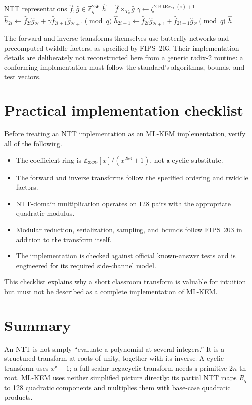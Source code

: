 \begin{algorithm}[H]
\caption{ML-KEM NTT-domain multiplication (conceptual form)}
\label{alg:mlkem-base-multiply}
\begin{algorithmic}[1]
\Require NTT representations $\hat f,\hat g\in\mathbb{Z}_q^{256}$
\Ensure $\hat h=\hat f\times_{T_q}\hat g$
  \State $\gamma\gets\zeta^{2\operatorname{BitRev}_7(i)+1}$
  \State $\hat h_{2i}\gets \hat f_{2i}\hat g_{2i}+\gamma\hat f_{2i+1}\hat g_{2i+1}\pmod q$
  \State $\hat h_{2i+1}\gets \hat f_{2i}\hat g_{2i+1}+\hat f_{2i+1}\hat g_{2i}\pmod q$
\EndFor
\State \Return $\hat h$
\end{algorithmic}
\end{algorithm}

The forward and inverse transforms themselves use butterfly networks and precomputed twiddle factors, as specified by FIPS~203. Their implementation details are deliberately not reconstructed here from a generic radix-2 routine: a conforming implementation must follow the standard's algorithms, bounds, and test vectors.

\section{Practical implementation checklist}

Before treating an NTT implementation as an ML-KEM implementation, verify all of the following.
\begin{itemize}
  \item The coefficient ring is $\mathbb{Z}_{3329}[x]/(x^{256}+1)$, not a cyclic substitute.
  \item The forward and inverse transforms follow the specified ordering and twiddle factors.
  \item NTT-domain multiplication operates on 128 pairs with the appropriate quadratic modulus.
  \item Modular reduction, serialization, sampling, and bounds follow FIPS~203 in addition to the transform itself.
  \item The implementation is checked against official known-answer tests and is engineered for its required side-channel model.
\end{itemize}

This checklist explains why a short classroom transform is valuable for intuition but must not be described as a complete implementation of ML-KEM.

\section{Summary}

An NTT is not simply ``evaluate a polynomial at several integers.'' It is a structured transform at roots of unity, together with its inverse. A cyclic transform uses $x^n-1$; a full scalar negacyclic transform needs a primitive $2n$-th root. ML-KEM uses neither simplified picture directly: its partial NTT maps $R_q$ to 128 quadratic components and multiplies them with base-case quadratic products.

\printbibliography[heading=chapterrefs]
